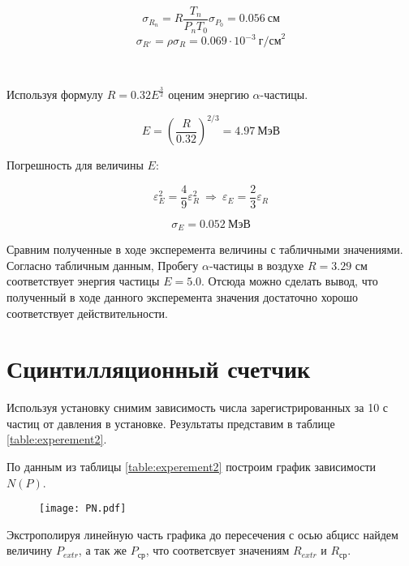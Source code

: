     \[ \sigma_{R_n} = R \frac{T_n}{P_n T_0} \sigma_{P_0} = 0.056 ~ \text{см} \]
    \[ \sigma_{R'} = \rho \sigma_R = 0.069 \cdot 10^{-3}  ~ \text{г/см}^2 \]

    \begin{center}
        \\
    \end{center}

    Используя формулу $R = 0.32 E^{\frac{3}{2}}$ оценим энергию $\alpha$-частицы.

    \[ E = \left(\frac{R}{0.32} \right)^{2/3} = 4.97 ~ \text{МэВ} \]

    Погрешность для величины $E$:

    \[ \varepsilon_E^2 = \frac{4}{9} \varepsilon_R^2 ~ \Rightarrow ~ \varepsilon_E = \frac{2}{3} \varepsilon_R \]

    \[ \sigma_E = 0.052 ~ \text{МэВ} \]

    \begin{center}
    \end{center}

    Сравним полученные в ходе эксперемента величины с табличными значениями. Согласно табличным данным,
    Пробегу $\alpha$-частицы в воздухе $R = 3.29$ см соответствует энергия частицы $E = 5.0$. Отсюда
    можно сделать вывод, что полученный в ходе данного эксперемента значения достаточно хорошо соответствует 
    действительности.

    \section*{Сцинтилляционный счетчик}

    Используя установку снимим зависимость числа зарегистрированных за 10 с частиц от давления в установке.
    Результаты представим в таблице \ref{table:experement2}.

    

    По данным из таблицы \ref{table:experement2} построим график зависимости $N(P)$.

    \begin{figure}
        \centering
        \texttt{[image: PN.pdf]}
        \caption{}
        \label{fig:plot2}
    \end{figure}

    Экстрополируя линейную часть графика до пересечения с осью абцисс найдем величину $P_{extr}$, а так же
    $P_{\text{ср}}$, что соответсвует значениям $R_{extr}$ и $R_{\text{ср}}$.

